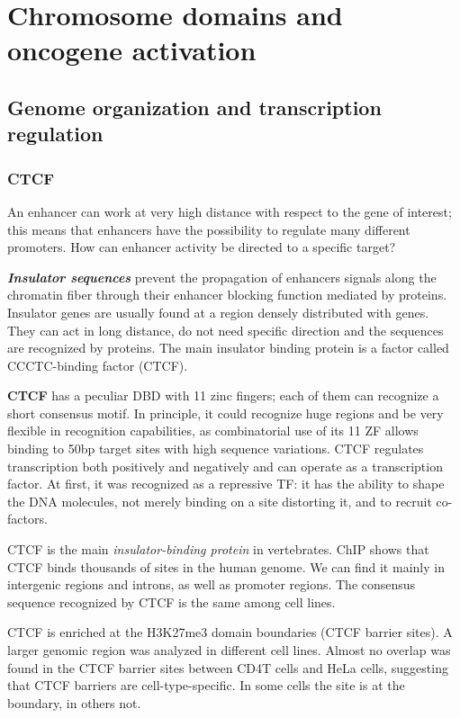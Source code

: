 \graphicspath{{chapters/_resources/}}

\chapter{Chromosome domains and oncogene activation}

\section{Genome organization and transcription regulation}

\subsection{CTCF}
An enhancer can work at very high distance with respect to the gene of interest; this means that enhancers have the possibility to regulate many different promoters. How can enhancer activity be directed to a specific target?

\textbf{\emph{Insulator sequences}} prevent the propagation of enhancers signals along the chromatin fiber through their enhancer blocking function mediated by proteins. Insulator genes are usually found at a region densely distributed with genes. They can act in long distance, do not need specific direction and the sequences are recognized by proteins. The main insulator binding protein is a factor called CCCTC-binding factor (CTCF).

\textbf{CTCF} has a peculiar DBD with 11 zinc fingers; each of them can recognize a short consensus motif. In principle, it could recognize huge regions and be very flexible in recognition capabilities, as combinatorial use of its 11 ZF allows binding to 50bp target sites with high sequence variations. CTCF regulates transcription both positively and negatively and can operate as a transcription factor. At first, it was recognized as a repressive TF: it has the ability to shape the DNA molecules, not merely binding on a site distorting it, and to recruit co-factors.

CTCF is the main \emph{insulator-binding protein} in vertebrates. ChIP shows that CTCF binds thousands of sites in the human genome. We can find it mainly in intergenic regions and introns, as well as promoter regions. The consensus sequence recognized by CTCF is the same among cell lines.

CTCF is enriched at the H3K27me3 domain boundaries (CTCF barrier sites). A larger genomic region was analyzed in different cell lines. Almost no overlap was found in the CTCF barrier sites between CD4T cells and HeLa cells, suggesting that CTCF barriers are cell-type-specific. In some cells the site is at the boundary, in others not.

